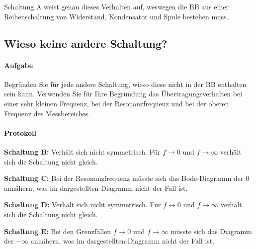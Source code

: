 \documentclass[10pt]{scrreprt}
\begin{document}
        Schaltung A weist genau dieses Verhalten auf, weswegen die BB aus einer
        Reihenschaltung von Widerstand, Kondensator und Spule bestehen muss.

        \subsection{Wieso keine andere Schaltung?}
        \paragraph{Aufgabe}
        Begründen Sie für jede andere Schaltung, wieso diese nicht in der BB enthalten
        sein kann. Verwenden Sie für Ihre Begründung das Übertragungsverhalten bei einer
        sehr kleinen Frequenz, bei der Resonanzfrequenz und bei der oberen Frequenz des
        Messbereiches.

        \paragraph{Protokoll}
        \textbf{Schaltung B:} Verhält sich nicht symmetrisch. Für $f \rightarrow 0$
        und $f \rightarrow \infty$ verhält sich die Schaltung nicht gleich.

        \textbf{Schaltung C:} Bei der Resonanzfrequenz müsste sich das Bode-Diagramm
        der 0 annähern, was im dargestellten Diagramm nicht der Fall ist.

        \textbf{Schaltung D:} Verhält sich nicht symmetrisch. Für $f \rightarrow 0$
        und $f \rightarrow \infty$ verhält sich die Schaltung nicht gleich.

        \textbf{Schaltung E:} Bei den Grenzfällen $f \rightarrow 0$ und
        $f \rightarrow \infty$ müsste sich das Diagramm der $-\infty$ annähern,
        was im dargestellten Diagramm nicht der Fall ist.
\end{document}
